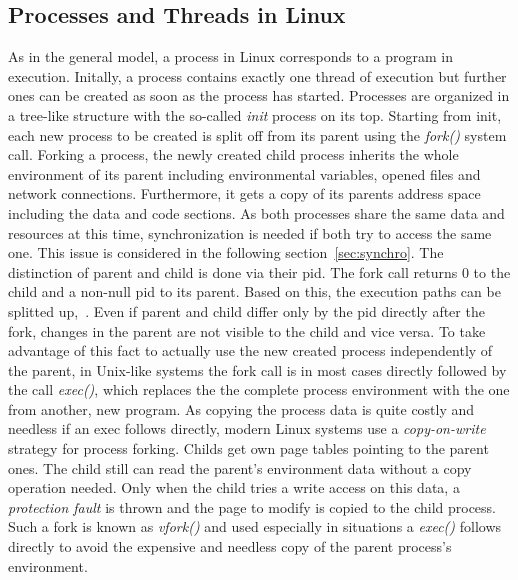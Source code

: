 \subsection{Processes and Threads in Linux} 
As in the general model, a process in Linux corresponds to a program in execution.
Initally, a process contains exactly one thread of execution but further ones can be created as soon as the process has started\cite{tanenbaum-modern-operating-systems}.
Processes are organized in a tree-like structure with the so-called \textit{init} process on its top.
Starting from init, each new process to be created is split off from its parent using the \textit{fork()} system call.
Forking a process, the newly created child process inherits the whole environment of its parent including environmental variables, opened files and network connections.
Furthermore, it gets a copy of its parents address space including the data and code sections.
As both processes share the same data and resources at this time, synchronization is needed if both try to access the same one\cite{mandl2014Grundkurs}.
This issue is considered in the following section~\ref{sec:synchro}.
The distinction of parent and child is done via their \ac{pid}.
The fork call returns 0 to the child and a non-null \ac{pid} to its parent. 
Based on this, the execution paths can be splitted up\cite{tanenbaum-modern-operating-systems},~\cite{mandl2014Grundkurs}.
Even if parent and child differ only by the \ac{pid} directly after the fork, changes in the parent are not visible to the child and vice versa.
To take advantage of this fact to actually use the new created process independently of the parent, in Unix-like systems the fork call is in most cases directly followed by the call \textit{exec()}, which replaces the the complete process environment with the one from another, new program.
As copying the process data is quite costly and needless if an exec follows directly, modern Linux systems use a \textit{copy-on-write} strategy for process forking.
Childs get own page tables pointing to the parent ones.
The child still can read the parent's environment data without a copy operation needed. 
Only when the child tries a write access on this data, a \textit{protection fault} is thrown and the page to modify is copied to the child process\cite{tanenbaum-modern-operating-systems}.
Such a fork is known as \textit{vfork()} and used especially in situations a \textit{exec()} follows directly to avoid the expensive and needless copy of the parent process's environment\cite{mandl2014Grundkurs}.

